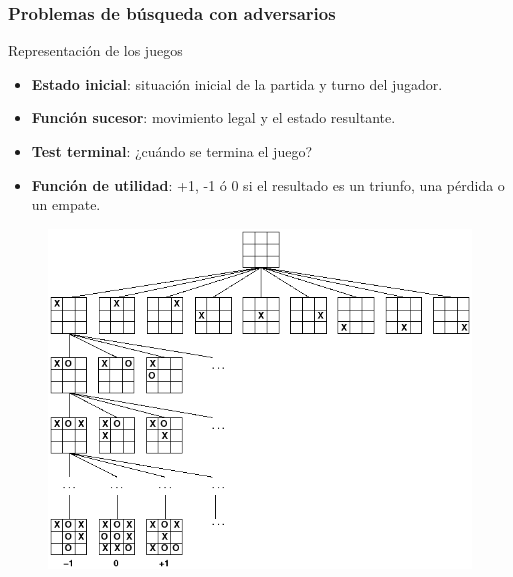 \documentclass[10pt]{beamer}
\begin{document}
\begin{frame}[squeeze]
\frametitle{Problemas de búsqueda con adversarios}

\begin{block}{Representación de los juegos}
\begin{itemize}
\item \textbf{Estado inicial}: situación inicial de la partida y turno del jugador.
\item \textbf{Función sucesor}: movimiento legal y el estado resultante.
\item \textbf{Test terminal}: ¿cuándo se termina el juego?
\item \textbf{Función de utilidad}: +1, -1 ó 0 si el resultado es un triunfo, una pérdida o un empate.
\end{itemize}
\end{block}

\begin{figure}[h]
	\centering
	\includegraphics[scale=0.25]{imagenes/game_tree.png}
	\label{fig:arbol_juego_3enraya}
\end{figure}

\end{frame}

\end{document}
